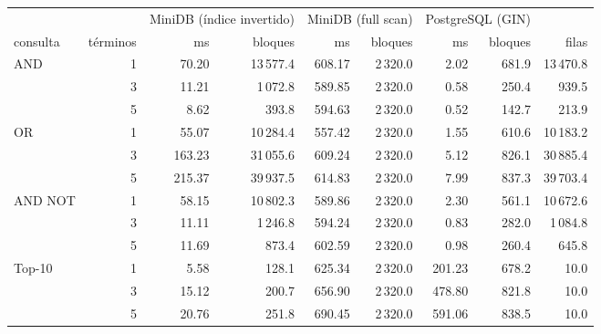 \begin{tabular}{@{}lrrrrrrrr@{}}
\toprule
 & & \multicolumn{2}{c}{MiniDB (índice invertido)} & \multicolumn{2}{c}{MiniDB (full scan)} & \multicolumn{2}{c}{PostgreSQL (GIN)} & \\
\cmidrule(lr){3-4}\cmidrule(lr){5-6}\cmidrule(lr){7-8}
consulta & términos & ms & bloques & ms & bloques & ms & bloques & filas \\
\midrule
AND & 1 & 70.20 & 13\,577.4 & 608.17 & 2\,320.0 & 2.02 & 681.9 & 13\,470.8 \\
 & 3 & 11.21 & 1\,072.8 & 589.85 & 2\,320.0 & 0.58 & 250.4 & 939.5 \\
 & 5 & 8.62 & 393.8 & 594.63 & 2\,320.0 & 0.52 & 142.7 & 213.9 \\
\addlinespace
OR & 1 & 55.07 & 10\,284.4 & 557.42 & 2\,320.0 & 1.55 & 610.6 & 10\,183.2 \\
 & 3 & 163.23 & 31\,055.6 & 609.24 & 2\,320.0 & 5.12 & 826.1 & 30\,885.4 \\
 & 5 & 215.37 & 39\,937.5 & 614.83 & 2\,320.0 & 7.99 & 837.3 & 39\,703.4 \\
\addlinespace
AND NOT & 1 & 58.15 & 10\,802.3 & 589.86 & 2\,320.0 & 2.30 & 561.1 & 10\,672.6 \\
 & 3 & 11.11 & 1\,246.8 & 594.24 & 2\,320.0 & 0.83 & 282.0 & 1\,084.8 \\
 & 5 & 11.69 & 873.4 & 602.59 & 2\,320.0 & 0.98 & 260.4 & 645.8 \\
\addlinespace
Top-10 & 1 & 5.58 & 128.1 & 625.34 & 2\,320.0 & 201.23 & 678.2 & 10.0 \\
 & 3 & 15.12 & 200.7 & 656.90 & 2\,320.0 & 478.80 & 821.8 & 10.0 \\
 & 5 & 20.76 & 251.8 & 690.45 & 2\,320.0 & 591.06 & 838.5 & 10.0 \\
\bottomrule
\end{tabular}
